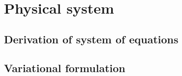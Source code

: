 \section{Physical system}\label{sec:physical_system}

\subsection{Derivation of system of equations}

\subsection{Variational formulation}
